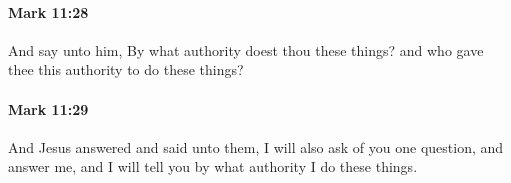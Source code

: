 		\paragraph{Mark 11:28} %
			\label{MARK-11-28}

			And say unto him, By what authority doest thou these things? and who gave thee this authority to do these things?

			\begin{framed}
			\scriptsize
				\begin{compactdesc}
					\item[SBLG]  \hyperref[EXOUSIA]{}  \hyperref[EXOUSIA]{} 
				\end{compactdesc}
			\end{framed}

		\paragraph{Mark 11:29} %
			\label{MARK-11-29}

			And Jesus answered and said unto them, I will also ask of you one question, and answer me, and I will tell you by what authority I do these things.

